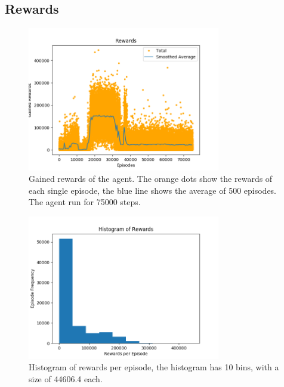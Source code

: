\documentclass{article}
\begin{document}
\subsection{Rewards}
\begin{figure}
\includegraphics[width=0.75\textwidth]{rewards.png}
\caption{Gained rewards of the agent. The orange dots show the rewards of each 
single episode, the blue line shows the average of 500 episodes. The agent run 
for 75000 steps.}
\label{rewards}
\end{figure}

\begin{figure}
\includegraphics[width=0.75\textwidth]{rewards_histogram.png}
\caption{Histogram of rewards per episode, the histogram has 10 bins, with a 
size of 44606.4 each.}
\label{rewards_histogram}
\end{figure}
\end{document}
